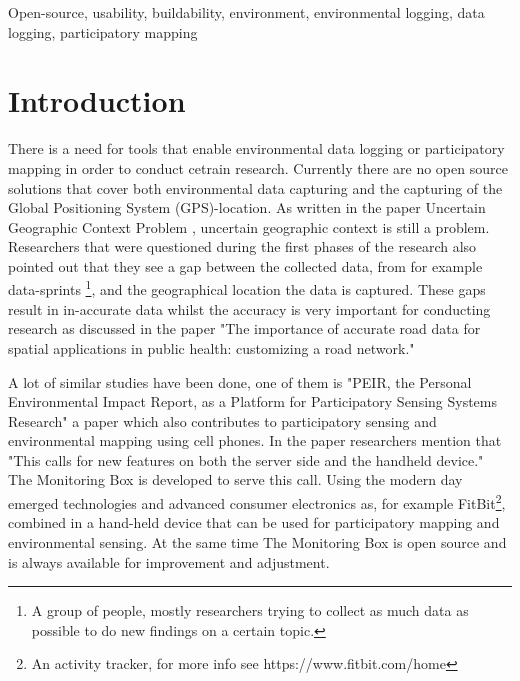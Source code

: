 \documentclass[conference]{IEEEtran}
\begin{document}
\begin{IEEEkeywords}
Open-source, usability, buildability, environment, environmental logging, data logging, participatory mapping 
\end{IEEEkeywords}

\IEEEpeerreviewmaketitle
\section{Introduction}
There is a need for tools that enable environmental data logging or participatory mapping in order to conduct cetrain research. Currently there are no open source solutions that cover both environmental data capturing and the capturing of the Global Positioning System (GPS)-location. As written in the paper Uncertain Geographic Context Problem \cite{kwan2012uncertain}, uncertain geographic context is still a problem. Researchers that were questioned during the first phases of the research also pointed out that they see a gap between the collected data, from for example data-sprints \footnote{ A group of people, mostly researchers trying to collect as much data as possible to do new findings on a certain topic.}, and the geographical location the data is captured. These gaps result in in-accurate data whilst the accuracy is very important for conducting research as discussed in the paper "The importance of accurate road data for spatial applications in public health: customizing a road network." \cite{frizzelle2009importance}

\par
A lot of similar studies have been done, one of them is "PEIR, the Personal Environmental Impact Report, as a Platform for Participatory Sensing Systems Research"
 \cite{mun2009peir} a paper which also contributes to participatory sensing and environmental mapping using cell phones. In the paper researchers mention that "This calls for new features on both the server side and the handheld device."  \cite{mun2009peir} \\
The Monitoring Box is developed to serve this call. Using the modern day emerged technologies and advanced consumer electronics as, for example FitBit\footnote{ An activity tracker, for more info see https://www.fitbit.com/home}, combined in a hand-held device that can be used for participatory mapping and environmental sensing. At the same time The Monitoring Box is open source and is always available for improvement and adjustment.  
\end{document}
